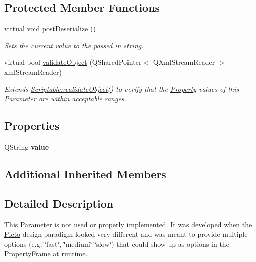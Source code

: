 \subsection*{Protected Member Functions}
\begin{DoxyCompactItemize}
\item 
virtual void \hyperlink{class_picto_1_1_choice_parameter_a84651aa9681bf61924b0e83baee5a851}{post\-Deserialize} ()
\begin{DoxyCompactList}\small\item\em Sets the current value to the passed in string. \end{DoxyCompactList}\item 
virtual bool \hyperlink{class_picto_1_1_choice_parameter_ab3f2a380621c79d187d6f7d9433e53c9}{validate\-Object} (Q\-Shared\-Pointer$<$ Q\-Xml\-Stream\-Reader $>$ xml\-Stream\-Reader)
\begin{DoxyCompactList}\small\item\em Extends \hyperlink{class_picto_1_1_scriptable_ab6e2944c43a3b5d418bf7b251594386d}{Scriptable\-::validate\-Object()} to verify that the \hyperlink{class_picto_1_1_property}{Property} values of this \hyperlink{class_picto_1_1_parameter}{Parameter} are within acceptable ranges. \end{DoxyCompactList}\end{DoxyCompactItemize}
\subsection*{Properties}
\begin{DoxyCompactItemize}
\item 
\hypertarget{class_picto_1_1_choice_parameter_a0be91a13b2fcedc2f66981b2583f6caf}{Q\-String {\bfseries value}}\label{class_picto_1_1_choice_parameter_a0be91a13b2fcedc2f66981b2583f6caf}

\end{DoxyCompactItemize}
\subsection*{Additional Inherited Members}


\subsection{Detailed Description}
This \hyperlink{class_picto_1_1_parameter}{Parameter} is not used or properly implemented. It was developed when the \hyperlink{namespace_picto}{Picto} design paradigm looked very different and was meant to provide multiple options (e.\-g. \char`\"{}fast\char`\"{}, \char`\"{}medium\char`\"{} \char`\"{}slow\char`\"{}) that could show up as options in the \hyperlink{class_property_frame}{Property\-Frame} at runtime. 

